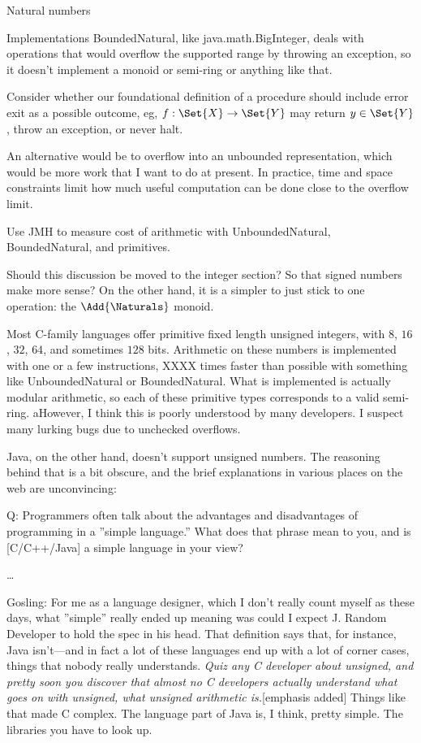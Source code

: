 \documentclass[12pt]{PalisadesLakesBook}
\begin{document}
\begin{plSection}{Natural numbers}
\begin{plSection}{Implementations}
{\javaFont BoundedNatural}, like {\javaFont java.math.BigInteger},
deals with operations that would overflow the supported range
by throwing an exception, 
so it doesn't implement a monoid or semi-ring 
or anything like that.

\TODO Consider whether our foundational definition of a procedure
should include error exit as a possible outcome, eg,
$ f : \Set{X} \rightarrow \Set{Y}$ may
return $y\in \Set{Y}$, throw an exception,
or never halt.

An alternative would be to overflow into an unbounded 
representation, which would be more work that I want to do 
at present.
In practice, time and space constraints limit how much useful
computation can be done close to the overflow limit.

\TODO Use JMH to measure cost of arithmetic with
{\javaFont UnboundedNatural},
{\javaFont BoundedNatural},
and primitives.

\TODO Should this discussion be moved to the integer section?
So that signed numbers make more sense? On the other hand, 
it is a simpler to just stick to one operation:
the $\Add{\Naturals}$ monoid.


Most C-family languages offer primitive fixed length
unsigned integers, with $8$, $16$, $32$, $64$, and 
sometimes $128$ bits.
Arithmetic on these numbers is implemented with one or a few
instructions, XXXX times faster than possible with something
like {\javaFont UnboundedNatural} or
{\javaFont BoundedNatural}.
What is implemented is actually modular arithmetic,
so each of these primitive types corresponds to a valid
semi-ring.
aHowever, I think this is poorly understood by many developers.
I suspect many lurking bugs due to unchecked overflows.

Java, on the other hand, doesn't support unsigned numbers.
The reasoning behind that is a bit obscure,
and the brief explanations in various places on the web
are unconvincing:

\begin{plQuote}
{}{}%
{%
Q: Programmers often talk about the advantages and disadvantages 
of programming in a ''simple language.''  
What does that phrase mean to you, and is [C/C++/Java] 
a simple language in your view? 

\ldots

Gosling: For me as a language designer, 
which I don't really count myself as these days, 
what ''simple'' really ended up meaning was could I expect 
J. Random Developer to hold the spec in his head. 
That definition says that, for instance, Java isn't---and 
in fact a lot of these languages end up 
with a lot of corner cases, things that nobody really understands. 
\emph{Quiz any C developer about unsigned, 
and pretty soon you discover 
that almost no C developers actually understand what goes on 
with unsigned, what unsigned arithmetic is.}[emphasis added] 
Things like that made C complex. 
The language part of Java is, I think, pretty simple. 
The libraries you have to look up.}


\end{plQuote}
\end{plSection}
\end{plSection}
\end{document}
